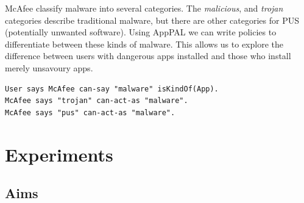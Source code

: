 \documentclass[twocolumn,letterpaper]{soups-poster}
\begin{document}
%         
%
%

McAfee classify malware into several categories. 
The \emph{malicious}, and \emph{trojan} categories describe traditional malware,
but there are other categories for PUS (potentially unwanted software).
Using AppPAL we can write policies to differentiate between these kinds of
malware.  This allows us to explore the difference between users with dangerous
apps installed and those who install merely unsavoury apps.
\begin{lstlisting}
User says McAfee can-say "malware" isKindOf(App).
McAfee says "trojan" can-act-as "malware".
McAfee says "pus" can-act-as "malware".
\end{lstlisting}

%

\section{Experiments}

\subsection{Aims}
\end{document}
